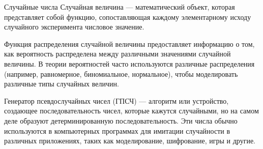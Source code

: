 \documentclass{beamer}
\begin{document}
	\begin{frame}{Случайные числа}
		Случайная величина --- математический объект, которая представляет собой функцию, сопоставляющая каждому элементарному исходу случайного эксперимента числовое значение.

		Функция распределения случайной величины предоставляет информацию о том, как вероятность распределена между различными значениями случайной величины. В теории вероятностей часто используются различные распределения (например, равномерное, биномиальное, нормальное), чтобы моделировать различные типы случайных величин.
		
		Генератор псевдослучайных чисел (ГПСЧ) --- алгоритм или устройство, создающее последовательность чисел, которые кажутся случайными, но на самом деле образуют детерминированную последовательность. Эти числа обычно используются в компьютерных программах для имитации случайности в различных приложениях, таких как моделирование, шифрование, игры и другие.


	\end{frame}

	
\end{document}
